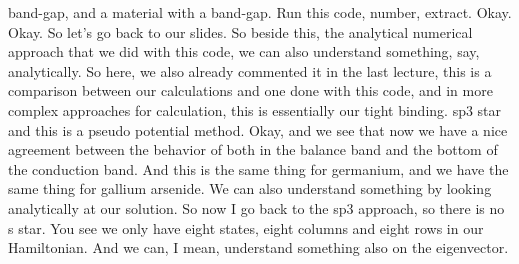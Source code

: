 band-gap, and a material with a band-gap. Run this code, number, extract. Okay. Okay. So let's go back to our slides. So beside this, the analytical numerical approach that we did with this code, we can also understand something, say, analytically. So here, we also already commented it in the last lecture, this is a comparison between our calculations and one done with this code, and in more complex approaches for calculation, this is essentially our tight binding. sp3 star and this is a pseudo potential method. Okay, and we see that now we have a nice agreement between the behavior of both in the balance band and the bottom of the conduction band. And this is the same thing for germanium, and we have the same thing for gallium arsenide. We can also understand something by looking analytically at our solution. So now I go back to the sp3 approach, so there is no s star. You see we only have eight states, eight columns and eight rows in our Hamiltonian. And we can, I mean, understand something also on the eigenvector.
